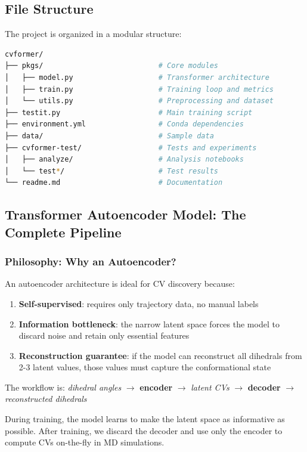 \documentclass[12pt,a4paper]{article}
\begin{document}
\subsection{File Structure}
The project is organized in a modular structure:

\begin{lstlisting}[language=bash]
cvformer/
├── pkgs/                           # Core modules
│   ├── model.py                    # Transformer architecture
│   ├── train.py                    # Training loop and metrics
│   └── utils.py                    # Preprocessing and dataset
├── testit.py                       # Main training script
├── environment.yml                 # Conda dependencies
├── data/                           # Sample data
├── cvformer-test/                  # Tests and experiments
│   ├── analyze/                    # Analysis notebooks
│   └── test*/                      # Test results
└── readme.md                       # Documentation
\end{lstlisting}

\subsection{Transformer Autoencoder Model: The Complete Pipeline}

\subsubsection{Philosophy: Why an Autoencoder?}

An autoencoder architecture is ideal for CV discovery because:
\begin{enumerate}
    \item \textbf{Self-supervised}: requires only trajectory data, no manual labels
    \item \textbf{Information bottleneck}: the narrow latent space forces the model to discard noise and retain only essential features
    \item \textbf{Reconstruction guarantee}: if the model can reconstruct all dihedrals from 2-3 latent values, those values must capture the conformational state
\end{enumerate}

The workflow is: \textit{dihedral angles} $\rightarrow$ \textbf{encoder} $\rightarrow$ \textit{latent CVs} $\rightarrow$ \textbf{decoder} $\rightarrow$ \textit{reconstructed dihedrals}

During training, the model learns to make the latent space as informative as possible. After training, we discard the decoder and use only the encoder to compute CVs on-the-fly in MD simulations.
\end{document}
